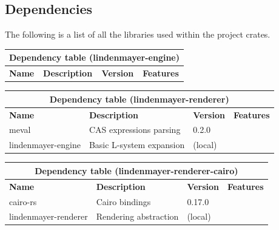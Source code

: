 \documentclass[a4paper]{article}
\begin{document}
\pagebreak

\subsection{Dependencies}

The following is a list of all the libraries used within the project
crates.

\bgroup{}
\def\arraystretch{1.5}
\begin{center}
    \begin{tabular}{ |p{2cm}|p{4cm}|p{1.5cm}|p{2cm}| }
        \hline
        \multicolumn{4}{|c|}{\textbf{Dependency table (lindenmayer-engine)}} \\
        \hline
        \textbf{Name} & \textbf{Description} & \textbf{Version} & \textbf{Features} \\
        \hline
    \end{tabular}
\end{center}
\egroup{}

\bgroup{}
\def\arraystretch{1.5}
\begin{center}
    \begin{tabular}{ |p{2cm}|p{4cm}|p{1.5cm}|p{2cm}| }
        \hline
        \multicolumn{4}{|c|}{\textbf{Dependency table (lindenmayer-renderer)}} \\
        \hline
        \textbf{Name} & \textbf{Description} & \textbf{Version} & \textbf{Features} \\
        \hline
        meval & \gls{CAS} expressions parsing & 0.2.0 & \- \\
        \hline
        lindenmayer-engine & Basic L-system expansion & (local) & \- \\
        \hline
    \end{tabular}
\end{center}
\egroup{}

\bgroup{}
\def\arraystretch{1.5}
\begin{center}
    \begin{tabular}{ |p{2cm}|p{4cm}|p{1.5cm}|p{2cm}| }
        \hline
        \multicolumn{4}{|c|}{\textbf{Dependency table (lindenmayer-renderer-cairo)}} \\
        \hline
        \textbf{Name} & \textbf{Description} & \textbf{Version} & \textbf{Features} \\
        \hline
        cairo-rs & Cairo bindings & 0.17.0 & \- \\
        \hline
        lindenmayer-renderer & Rendering abstraction & (local) & \- \\
        \hline
    \end{tabular}
\end{center}
\egroup{}
\end{document}
